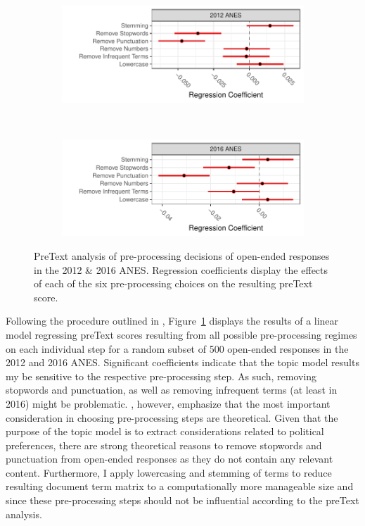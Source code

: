 \documentclass[12pt]{article}
\begin{document}
\begin{figure}[h]
    \centering
    \begin{subfigure}[t]{1\textwidth}
        \centering
        \includegraphics{../fig/pretext2012.pdf}
    \end{subfigure}%
    \\
    \begin{subfigure}[t]{1\textwidth}
        \centering
        \includegraphics{../fig/pretext2016.pdf}
    \end{subfigure}
    \caption{PreText analysis of pre-processing decisions of open-ended responses in the 2012 \& 2016 ANES. Regression coefficients display the effects of each of the six pre-processing choices on the resulting preText score.}\label{fig:pretext}
\end{figure}

Following the procedure outlined in \citet{denny2018text}, Figure~\ref{fig:pretext} displays the results of a linear model regressing preText scores resulting from all possible pre-processing regimes on each individual step for a random subset of 500 open-ended responses in the 2012 and 2016 ANES. Significant coefficients indicate that the topic model results my be sensitive to the respective pre-processing step. As such, removing stopwords and punctuation, as well as removing infrequent terms (at least in 2016) might be problematic. \citet{denny2018text}, however, emphasize that the most important consideration in choosing pre-processing steps are theoretical. Given that the purpose of the topic model is to extract considerations related to political preferences, there are strong theoretical reasons to remove stopwords and punctuation from open-ended responses as they do not contain any relevant content. Furthermore, I apply lowercasing and stemming of terms to reduce resulting document term matrix to a computationally more manageable size and since these pre-processing steps should not be influential according to the preText analysis.
\end{document}
